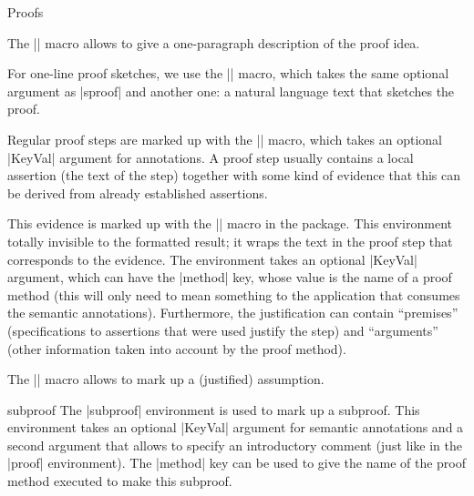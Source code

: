 \begin{sfragment}{Proofs}
\begin{function}{\spfidea}
  The |\spfidea| macro allows to give a one-paragraph description of the proof idea.
\end{function}

\begin{function}{\spfsketch}
  For one-line proof sketches, we use the |\spfsketch| macro, which takes the same
  optional argument as |sproof| and another one: a natural language text that sketches
  the proof.
\end{function}

\begin{function}{\spfstep}
  Regular proof steps are marked up with the |\spfstep| macro, which takes an optional
  |KeyVal| argument for annotations. A proof step usually contains a local assertion
  (the text of the step) together with some kind of evidence that this can be derived
  from already established assertions.
\end{function}

\begin{function}{\spfjust}
  This evidence is marked up with the |\spfjust| macro in the 
  package. This environment totally invisible to the formatted result; it wraps the text
  in the proof step that corresponds to the evidence. The environment takes an optional
  |KeyVal| argument, which can have the |method| key, whose value is the name of a proof
  method (this will only need to mean something to the application that consumes the
  semantic annotations). Furthermore, the justification can contain ``premises''
  (specifications to assertions that were used justify the step) and ``arguments''
  (other information taken into account by the proof method).
\end{function}

\begin{function}{\assumption}
  The |\assumption| macro allows to mark up a (justified) assumption.
\end{function}

\begin{function}{\justarg}
\end{function}

\begin{environment}{subproof}
  The |subproof| environment is used to mark up a subproof. This environment takes an
  optional |KeyVal| argument for semantic annotations and a second argument that allows
  to specify an introductory comment (just like in the |proof| environment). The
  |method| key can be used to give the name of the proof method
  executed to make this subproof.
\end{environment}


\end{sfragment}
